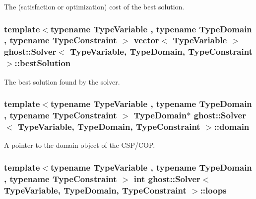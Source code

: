 The (satisfaction or optimization) cost of the best solution. 

\hypertarget{classghost_1_1Solver_aa76ec90c418b23b261a0f3da63a9ee4a}{
\subsubsection[{best\-Solution}]{\setlength{\rightskip}{0pt plus 5cm}template$<$typename Type\-Variable , typename Type\-Domain , typename Type\-Constraint $>$ vector$<$ Type\-Variable $>$ {\bf ghost\-::\-Solver}$<$ Type\-Variable, Type\-Domain, Type\-Constraint $>$\-::best\-Solution\hspace{0.3cm}{\ttfamily [private]}}}\label{classghost_1_1Solver_aa76ec90c418b23b261a0f3da63a9ee4a}


The best solution found by the solver. 

\hypertarget{classghost_1_1Solver_ad9292e9219261ba8058fec05b453c0c9}{
\subsubsection[{domain}]{\setlength{\rightskip}{0pt plus 5cm}template$<$typename Type\-Variable , typename Type\-Domain , typename Type\-Constraint $>$ Type\-Domain$\ast$ {\bf ghost\-::\-Solver}$<$ Type\-Variable, Type\-Domain, Type\-Constraint $>$\-::domain\hspace{0.3cm}{\ttfamily [private]}}}\label{classghost_1_1Solver_ad9292e9219261ba8058fec05b453c0c9}


A pointer to the domain object of the C\-S\-P/\-C\-O\-P. 

\hypertarget{classghost_1_1Solver_aa6a77e14862a9be467e6c6c76124b526}{
\subsubsection[{loops}]{\setlength{\rightskip}{0pt plus 5cm}template$<$typename Type\-Variable , typename Type\-Domain , typename Type\-Constraint $>$ int {\bf ghost\-::\-Solver}$<$ Type\-Variable, Type\-Domain, Type\-Constraint $>$\-::loops\hspace{0.3cm}{\ttfamily [private]}}}\label{classghost_1_1Solver_aa6a77e14862a9be467e6c6c76124b526}


